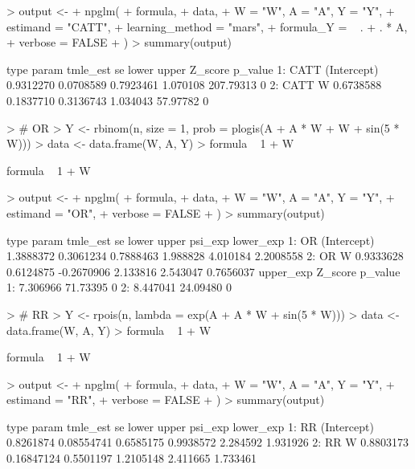 \documentclass{article}
\begin{document}
\begin{Schunk}
\begin{Sinput}
> output <-
+   npglm(
+     formula,
+     data,
+     W = "W", A = "A", Y = "Y",
+     estimand = "CATT",
+     learning_method = "mars",
+     formula_Y = ~ . + . * A,
+     verbose = FALSE
+   )
> summary(output)
\end{Sinput}
\begin{Soutput}
   type       param  tmle_est        se     lower    upper   Z_score p_value
1: CATT (Intercept) 0.9312270 0.0708589 0.7923461 1.070108 207.79313       0
2: CATT           W 0.6738588 0.1837710 0.3136743 1.034043  57.97782       0
\end{Soutput}
\begin{Sinput}
> # OR
> Y <- rbinom(n, size = 1, prob = plogis(A + A * W + W + sin(5 * W)))
> data <- data.frame(W, A, Y)
> formula ~ 1 + W
\end{Sinput}
\begin{Soutput}
formula ~ 1 + W
\end{Soutput}
\begin{Sinput}
> output <-
+   npglm(
+     formula,
+     data,
+     W = "W", A = "A", Y = "Y",
+     estimand = "OR",
+     verbose = FALSE
+   )
> summary(output)
\end{Sinput}
\begin{Soutput}
   type       param  tmle_est        se      lower    upper  psi_exp lower_exp
1:   OR (Intercept) 1.3888372 0.3061234  0.7888463 1.988828 4.010184 2.2008558
2:   OR           W 0.9333628 0.6124875 -0.2670906 2.133816 2.543047 0.7656037
   upper_exp  Z_score p_value
1:  7.306966 71.73395       0
2:  8.447041 24.09480       0
\end{Soutput}
\begin{Sinput}
> # RR
> Y <- rpois(n, lambda = exp(A + A * W + sin(5 * W)))
> data <- data.frame(W, A, Y)
> formula ~ 1 + W
\end{Sinput}
\begin{Soutput}
formula ~ 1 + W
\end{Soutput}
\begin{Sinput}
> output <-
+   npglm(
+     formula,
+     data,
+     W = "W", A = "A", Y = "Y",
+     estimand = "RR",
+     verbose = FALSE
+   )
> summary(output)
\end{Sinput}
\begin{Soutput}
   type       param  tmle_est         se     lower     upper  psi_exp lower_exp
1:   RR (Intercept) 0.8261874 0.08554741 0.6585175 0.9938572 2.284592  1.931926
2:   RR           W 0.8803173 0.16847124 0.5501197 1.2105148 2.411665  1.733461

\end{Soutput}
\end{Schunk}
\end{document}
